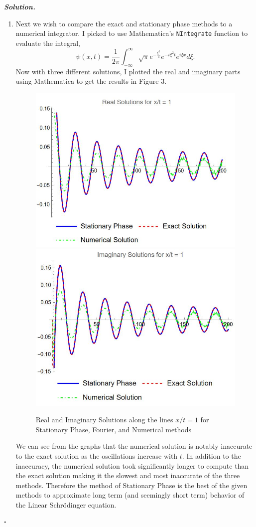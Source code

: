 \documentclass[12pt]{report}
\newenvironment{solution}[1][\it{Solution}]{\textbf{#1. } }{$\square$}
\begin{document}
\begin{solution}
\begin{enumerate}
        \item Next we wish to compare the exact and stationary phase methods to a numerical integrator. I picked to use Mathematica's \verb+NIntegrate+ function to evaluate the integral, 
        \[
            \psi(x,t) = \frac{1}{2\pi}\int_{-\infty}^{\infty} \sqrt{\pi} e^{-\frac{\xi^2}{4}} e^{-i\xi^2 t}e^{i\xi x} d\xi.
        \] 
        Now with three different solutions, I plotted the real and imaginary parts using Mathematica to get the results in Figure 3.
        \begin{figure}%
            \centering
            \includegraphics[width=.4\textwidth]{plots/realx3.JPG}
            \qquad
            \includegraphics[width=.4\textwidth]{plots/fakex3.JPG}
            \caption{Real and Imaginary Solutions along the lines $x/t=1$ for Stationary Phase, Fourier, and Numerical methods}%
            \label{fig:Figure 3}%
        \end{figure} 
        We can see from the graphs that the numerical solution is notably inaccurate to the exact solution as the oscillations increase with $t$. In addition to the inaccuracy, the numerical solution took significantly longer to compute than the exact solution making it the slowest and most inaccurate of the three methods. Therefore the method of Stationary Phase is the best of the given methods to approximate long term (and seemingly short term) behavior of the Linear Schr\"odinger equation.
    \end{enumerate}
\end{solution}

\newpage
\end{document}
